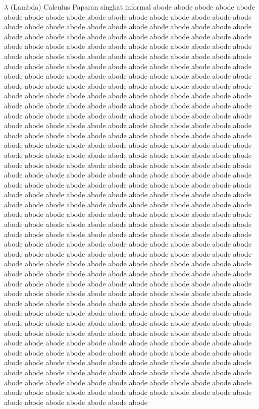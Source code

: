 \documentclass[aspectratio=1610,10pt,handout]{beamer}
\begin{document}
\begin{frame}{$\lambda$ (Lambda) Calculus }{Paparan singkat informal}
{    abode abode abode abode abode abode abode abode abode abode abode abode abode abode abode abode abode abode abode abode abode abode abode abode abode abode abode abode abode abode abode abode abode abode abode abode abode abode abode abode abode abode abode abode abode abode abode abode abode abode abode abode abode abode abode abode abode abode abode abode abode abode abode abode abode abode abode abode abode abode abode abode abode abode abode abode abode abode abode abode abode abode abode abode abode abode abode abode abode abode abode abode abode abode abode abode abode abode abode abode abode abode abode abode abode abode abode abode abode abode abode abode abode abode abode abode abode abode abode abode abode abode abode abode abode abode abode abode abode abode abode abode abode abode abode abode abode abode abode abode abode abode abode abode abode abode abode abode abode abode abode abode abode abode abode abode abode abode abode abode abode abode abode abode abode abode abode abode abode abode abode abode abode abode abode abode abode abode abode abode abode abode abode abode abode abode abode abode abode abode abode abode abode abode abode abode abode abode abode abode abode abode abode abode abode abode abode abode abode abode abode abode abode abode abode abode abode abode abode abode abode abode abode abode abode abode abode abode abode abode abode abode abode abode abode abode abode abode abode abode abode abode abode abode abode abode abode abode abode abode abode abode abode abode abode abode abode abode abode abode abode abode abode abode abode abode abode abode abode abode abode abode abode abode abode abode abode abode abode abode abode abode abode abode abode abode abode abode abode abode abode abode abode abode abode abode abode abode abode abode abode abode abode abode abode abode abode abode abode abode abode abode abode abode abode abode abode abode abode abode abode abode abode abode abode abode abode abode abode abode abode abode abode abode abode abode abode abode abode abode abode abode abode abode abode abode abode abode abode abode abode abode abode abode abode abode abode abode abode abode abode abode abode abode abode abode abode abode abode abode abode abode abode abode abode abode abode abode abode abode abode abode abode abode abode abode abode abode abode abode abode abode abode abode abode abode abode abode abode abode abode abode abode abode abode abode abode abode abode abode abode abode abode abode abode abode abode abode abode abode abode abode abode abode abode abode abode abode abode abode abode abode abode abode abode abode abode abode abode abode abode abode abode abode abode abode abode abode abode abode abode abode abode abode abode abode abode abode abode abode abode abode abode abode abode abode abode abode abode abode abode abode abode abode abode abode abode abode abode abode 
  }
\end{frame}
\end{document}
